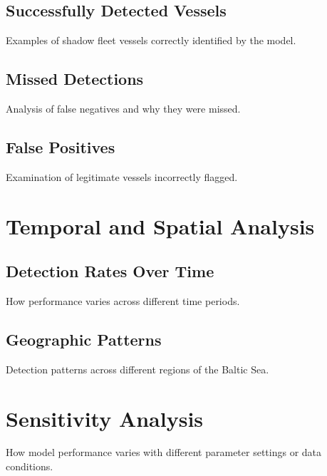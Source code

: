 \subsection{Successfully Detected Vessels}
Examples of shadow fleet vessels correctly identified by the model.

\subsection{Missed Detections}
Analysis of false negatives and why they were missed.

\subsection{False Positives}
Examination of legitimate vessels incorrectly flagged.

\section{Temporal and Spatial Analysis}
\subsection{Detection Rates Over Time}
How performance varies across different time periods.

\subsection{Geographic Patterns}
Detection patterns across different regions of the Baltic Sea.

\section{Sensitivity Analysis}
How model performance varies with different parameter settings or data conditions.
